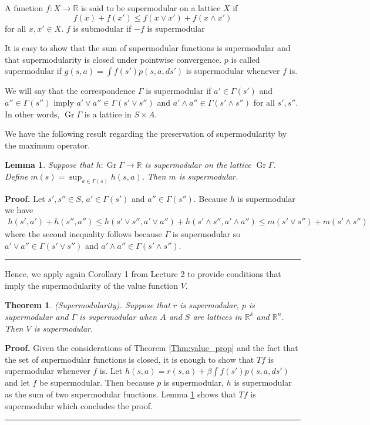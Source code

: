 \documentclass[letter,11pt]{article}
\newtheorem{theorem}{Theorem}[section]
\newtheorem{lemma}{Lemma}[section]
\newenvironment {proof}[1][Proof]{\noindent \textbf {#1.} }{\ \rule {0.5em}{0.5em}}
\begin{document}
A function $f:X \rightarrow \mathbb{R}$ is said to be supermodular on a lattice $X$ if 
$$ f(x) + f(x') \leq f(x \lor x') + f(x \land x')$$
for all $x,x' \in X$. $f$ is submodular if $-f$ is supermodular 

It is easy to show that the sum of supermodular functions is supermodular and that supermodularity is closed under pointwise convergence. $p$ is called supermodular if $g(s,a) = \int f(s') p(s,a,ds')$ is supermodular whenever $f$ is. 

We will say that the correspondence $\Gamma$ is supermodular if $a' \in \Gamma(s')$ and $a'' \in \Gamma(s'')$ imply $a' \lor a'' \in \Gamma (s' \lor s'')$ and $a' \land a'' \in \Gamma (s' \land s'')$ for all $s',s''$. In other words, $\operatorname{Gr} \Gamma$ is a lattice in $S \times A$. 

We have the following result regarding the preservation of supermodularity by the maximum operator.
\begin{lemma} \label{lemma:maxsuper}
Suppose that $h:\operatorname{Gr} \Gamma \rightarrow \mathbb{R}$ is supermodular on the lattice  $\operatorname{Gr} \Gamma$.  Define $ m(s) = \sup _{a \in \Gamma(s)} h(s,a) $.  Then $m$ is supermodular. 
\end{lemma}


\begin{proof}
    Let $s',s'' \in S$, $a' \in \Gamma(s')$ and $a'' \in \Gamma(s'')$. Because $h$ is supermodular we have 
\begin{align*}
    h(s',a') + h(s'',a'') \leq h(s' \lor s'', a' \lor a'') + h(s' \land s'', a' \land a'') \leq m(s' \lor s'') + m(s' \land s'')
\end{align*}
where the second inequality follows because $\Gamma$ is supermodular so $a' \lor a'' \in \Gamma (s' \lor s'')$ and $a' \land a'' \in \Gamma (s' \land s'')$. 
\end{proof}

Hence, we apply again Corollary 1 from Lecture 2 to provide conditions that imply the supermodularity of the value function $V$. 

\begin{theorem} \label{Them:supermodular} (Supermodularity). 
    Suppose that $r$ is supermodular, $p$ is supermodular and $\Gamma$ is supermodular  when $A$ and $S$ are lattices in $\mathbb{R}^{k}$ and $\mathbb{R}^{n}$. Then $V$ is supermodular.
\end{theorem}

\begin{proof}
  Given the considerations of Theorem \ref{Thm:value_prop} and the fact that the set of supermodular functions is closed, it is enough to show that $Tf$ is supermodular whenever $f$ is.   Let $h(s,a) = r(s,a) + \beta \int f(s')p(s,a,ds') $ and let $f$ be supermodular. Then because $p$ is supermodular, $h$ is supermodular as the sum of two supermodular functions.  Lemma \ref{lemma:maxsuper} shows that $Tf$ is supermodular which concludes the proof.
\end{proof}
\end{document}
